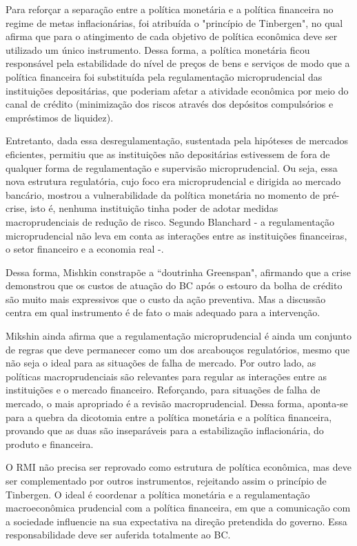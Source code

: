 \documentclass[report]{uftex}
\begin{document}
Para reforçar a separação entre a política monetária e a política financeira no regime de metas inflacionárias, foi atribuída o "princípio de Tinbergen", no qual afirma que para o atingimento de cada objetivo de política econômica deve ser utilizado um único instrumento. Dessa forma, a política monetária ficou responsável pela estabilidade do nível de preços de bens e serviços de modo que a política financeira foi substituída pela regulamentação microprudencial das instituições depositárias, que poderiam afetar a atividade econômica por meio do canal de crédito (minimização dos riscos através dos depósitos compulsórios e empréstimos de liquidez). 

Entretanto, dada essa desregulamentação, sustentada pela hipóteses de mercados eficientes, permitiu que as instituições não depositárias estivessem de fora de qualquer forma de regulamentação e supervisão microprudencial. Ou seja, essa nova estrutura regulatória, cujo foco era microprudencial e dirigida ao mercado bancário, mostrou a vulnerabilidade da política monetária no momento de pré-crise, isto é, nenhuma instituição tinha poder de adotar medidas macroprudenciais de redução de risco. Segundo Blanchard - a regulamentação microprudencial não leva em conta as interações entre as instituições financeiras, o setor financeiro e a economia real -.

Dessa forma, Mishkin constrapõe a ``doutrinha Greenspan", afirmando que a crise demonstrou que os custos de atuação do BC após o estouro da bolha de crédito são muito mais expressivos que o custo da ação preventiva. Mas a discussão centra em qual instrumento é de fato o mais adequado para a intervenção. 

Mikshin ainda afirma que a regulamentação microprudencial é ainda um conjunto de regras que deve permanecer como um dos arcabouços regulatórios, mesmo que não seja o ideal para as situações de falha de mercado. Por outro lado, as políticas macroprudenciais são relevantes para regular as interações entre as instituições e o mercado financeiro. Reforçando, para situações de falha de mercado, o mais apropriado é a revisão macroprudencial. Dessa forma, aponta-se para a quebra da dicotomia entre a política monetária e a política financeira, provando que as duas são inseparáveis para a estabilização inflacionária, do produto e financeira. 

 
O RMI não precisa ser reprovado como estrutura de política econômica, mas deve ser complementado por outros instrumentos, rejeitando assim o princípio de Tinbergen. O ideal é coordenar a política monetária e a regulamentação macroeconômica prudencial com a política financeira, em que a comunicação com a sociedade influencie na sua expectativa na direção pretendida do governo. Essa responsabilidade deve ser auferida totalmente ao BC. 
\end{document}
